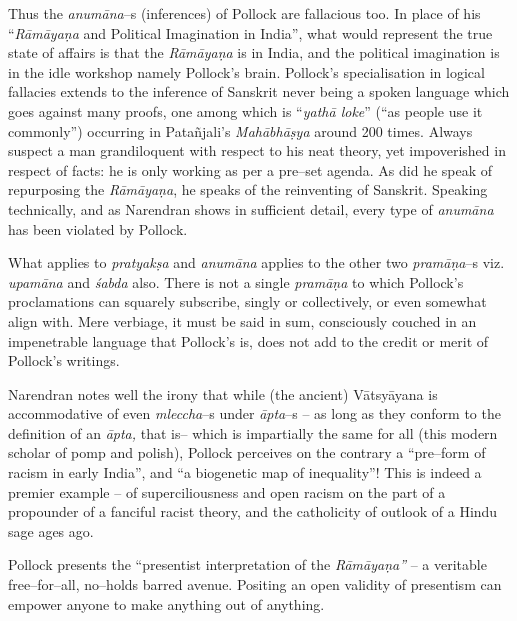 Thus the \textit{anumāna}–s (inferences) of Pollock are fallacious too. In place of his “\textit{Rāmāyaṇa} and Political Imagination in India”, what would represent the true state of affairs is that the \textit{Rāmāyaṇa} is in India, and the political imagination is in the idle workshop namely Pollock’s brain. Pollock’s specialisation in logical fallacies extends to the inference of Sanskrit never being a spoken language which goes against many proofs, one among which is “\textit{yathā loke}” (“as people use it commonly”) occurring in Patañjali’s \textit{Mahābhāṣya} around 200 times. Always suspect a man grandiloquent with respect to his neat theory, yet impoverished in respect of facts: he is only working as per a pre–set agenda. As did he speak of repurposing the \textit{Rāmāyaṇa}, he speaks of the reinventing of Sanskrit. Speaking technically, and as Narendran shows in sufficient detail, every type of \textit{anumāna} has been violated by Pollock.

What applies to \textit{pratyakṣa} and \textit{anumāna} applies to the other two \textit{pramāṇa}–s viz. \textit{upamāna} and \textit{śabda} also. There is not a single \textit{pramāṇa} to which Pollock’s proclamations can squarely subscribe, singly or collectively, or even somewhat align with. Mere verbiage, it must be said in sum, consciously couched in an impenetrable language that Pollock’s is, does not add to the credit or merit of Pollock’s writings.

Narendran notes well the irony that while (the ancient) Vātsyāyana is accommodative of even \textit{mleccha}–s under \textit{āpta}–s – as long as they conform to the definition of an \textit{āpta,} that is– which is impartially the same for all (this modern scholar of pomp and polish), Pollock perceives on the contrary a “pre–form of racism in early India”, and “a biogenetic map of inequality”! This is indeed a premier example – of superciliousness and open racism on the part of a propounder of a fanciful racist theory, and the catholicity of outlook of a Hindu sage ages ago.

Pollock presents the “presentist interpretation of the \textit{Rāmāyaṇa”} – a veritable free–for–all, no–holds barred avenue. Positing an open validity of presentism can empower anyone to make anything out of anything.

